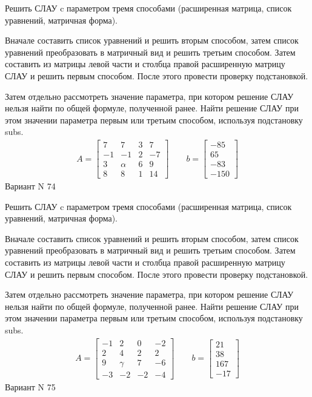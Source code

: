 \documentclass[11pt]{report}
\begin{document}
Решить СЛАУ c параметром тремя способами (расширенная матрица, список уравнений, матричная форма).

Вначале составить список уравнений и решить вторым способом,
затем список уравнений преобразовать в матричный вид и решить третьим способом.
Затем составить из матрицы левой части и столбца правой расширенную матрицу СЛАУ и решить первым способом.
После этого провести проверку подстановкой.

Затем отдельно рассмотреть значение параметра, при котором решение СЛАУ нельзя найти по общей формуле,
полученной ранее.
Найти решение СЛАУ при этом значении параметра первым или третьим способом, используя подстановку subs.
\begin{align*}
    A = \left[\begin{matrix}7 & 7 & 3 & 7\\-1 & -1 & 2 & -7\\3 & \alpha & 6 & 9\\8 & 8 & 1 & 14\end{matrix}\right]
\qquad b = \left[\begin{matrix}-85\\65\\-83\\-150\end{matrix}\right]
\end{align*}
\newpage
Вариант N 74


Решить СЛАУ c параметром тремя способами (расширенная матрица, список уравнений, матричная форма).

Вначале составить список уравнений и решить вторым способом,
затем список уравнений преобразовать в матричный вид и решить третьим способом.
Затем составить из матрицы левой части и столбца правой расширенную матрицу СЛАУ и решить первым способом.
После этого провести проверку подстановкой.

Затем отдельно рассмотреть значение параметра, при котором решение СЛАУ нельзя найти по общей формуле,
полученной ранее.
Найти решение СЛАУ при этом значении параметра первым или третьим способом, используя подстановку subs.
\begin{align*}
    A = \left[\begin{matrix}-1 & 2 & 0 & -2\\2 & 4 & 2 & 2\\9 & \gamma & 7 & -6\\-3 & -2 & -2 & -4\end{matrix}\right]
\qquad b = \left[\begin{matrix}21\\38\\167\\-17\end{matrix}\right]
\end{align*}
\newpage
Вариант N 75
\end{document}
